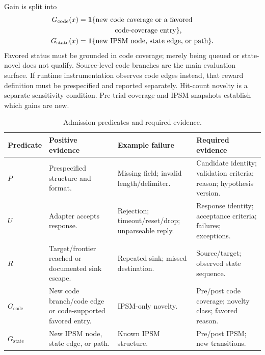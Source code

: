 \documentclass[final,5p,times,number]{elsarticle}
\newcommand{\gcode}{G_{\mathrm{code}}}
\newcommand{\gstate}{G_{\mathrm{state}}}
\begin{document}
Gain is split into
\begin{align}
\gcode(x)&=\mathbf{1}\{\text{new code coverage or a favored}\nonumber\\
&\hspace{18mm}\text{code-coverage entry}\},\label{eq:gcode}\\
\gstate(x)&=\mathbf{1}\{\text{new IPSM node, state edge, or path}\}.\label{eq:gstate}
\end{align}
Favored status must be grounded in code coverage; merely being queued or state-novel does not qualify. Source-level code branches are the main evaluation surface. If runtime instrumentation observes code edges instead, that reward definition must be prespecified and reported separately. Hit-count novelty is a separate sensitivity condition. Pre-trial coverage and IPSM snapshots establish which gains are new.

\begin{table}[!tbp]
\centering\small
\caption{Admission predicates and required evidence.}
\label{tab:predicates}
\begin{tabularx}{\textwidth}{l Y Y Y}
\toprule
Predicate & Positive evidence & Example failure & Required evidence \\
\midrule
$P$ & Prespecified structure and format. & Missing field; invalid length/delimiter. & Candidate identity; validation criteria; reason; hypothesis version. \\
$U$ & Adapter accepts response. & Rejection; timeout/reset/drop; unparseable reply. & Response identity; acceptance criteria; failures; exceptions. \\
$R$ & Target/frontier reached or documented sink escape. & Repeated sink; missed destination. & Source/target; observed state sequence. \\
$\gcode$ & New code branch/code edge or code-supported favored entry. & IPSM-only novelty. & Pre/post code coverage; novelty class; favored reason. \\
$\gstate$ & New IPSM node, state edge, or path. & Known IPSM structure. & Pre/post IPSM; new transitions. \\
\bottomrule
\end{tabularx}
\end{table}
\end{document}
